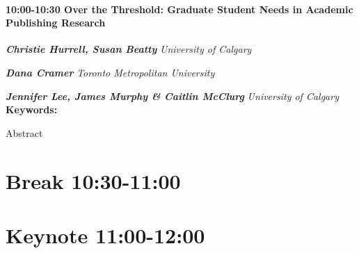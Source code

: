 \documentclass[
]{book}
\begin{document}
\begin{session}
\hypertarget{over-the-threshold-graduate-student-needs-in-academic-publishing-research}{%
\paragraph*{\texorpdfstring{10:00-10:30 \textbar{} \textbf{Over the
Threshold: Graduate Student Needs in Academic Publishing} \textbar{}
Research}{10:00-10:30 \textbar{} Over the Threshold: Graduate Student Needs in Academic Publishing \textbar{} Research}}\label{over-the-threshold-graduate-student-needs-in-academic-publishing-research}}

\textbf{\emph{Christie Hurrell, Susan Beatty}} \textbar{}
\emph{University of Calgary}

\textbf{\emph{Dana Cramer}} \textbar{} \emph{Toronto Metropolitan
University}

\textbf{\emph{Jennifer Lee, James Murphy \& Caitlin McClurg}} \textbar{}
\emph{University of Calgary} \textbf{Keywords:}

Abstract
\end{session}

\hypertarget{break-1030-1100}{%
\section*{Break \textbar{} 10:30-11:00}\label{break-1030-1100}}

\hypertarget{keynote-1100-1200}{%
\section*{Keynote \textbar{} 11:00-12:00}\label{keynote-1100-1200}}
\end{document}
